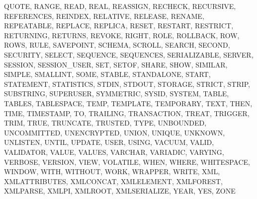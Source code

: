 \documentclass{article}
\begin{document}
QUOTE,
RANGE,
READ,
REAL,
REASSIGN,
RECHECK,
RECURSIVE,
REFERENCES,
REINDEX,
RELATIVE,
RELEASE,
RENAME,
REPEATABLE,
REPLACE,
REPLICA,
RESET,
RESTART,
RESTRICT,
RETURNING,
RETURNS,
REVOKE,
RIGHT,
ROLE,
ROLLBACK,
ROW,
ROWS,
RULE,
SAVEPOINT,
SCHEMA,
SCROLL,
SEARCH,
SECOND,
SECURITY,
SELECT,
SEQUENCE,
SEQUENCES,
SERIALIZABLE,
SERVER,
SESSION,
SESSION\_USER,
SET,
SETOF,
SHARE,
SHOW,
SIMILAR,
SIMPLE,
SMALLINT,
SOME,
STABLE,
STANDALONE,
START,
STATEMENT,
STATISTICS,
STDIN,
STDOUT,
STORAGE,
STRICT,
STRIP,
SUBSTRING,
SUPERUSER,
SYMMETRIC,
SYSID,
SYSTEM,
TABLE,
TABLES,
TABLESPACE,
TEMP,
TEMPLATE,
TEMPORARY,
TEXT,
THEN,
TIME,
TIMESTAMP,
TO,
TRAILING,
TRANSACTION,
TREAT,
TRIGGER,
TRIM,
TRUE,
TRUNCATE,
TRUSTED,
TYPE,
UNBOUNDED,
UNCOMMITTED,
UNENCRYPTED,
UNION,
UNIQUE,
UNKNOWN,
UNLISTEN,
UNTIL,
UPDATE,
USER,
USING,
VACUUM,
VALID,
VALIDATOR,
VALUE,
VALUES,
VARCHAR,
VARIADIC,
VARYING,
VERBOSE,
VERSION,
VIEW,
VOLATILE,
WHEN,
WHERE,
WHITESPACE,
WINDOW,
WITH,
WITHOUT,
WORK,
WRAPPER,
WRITE,
XML,
XMLATTRIBUTES,
XMLCONCAT,
XMLELEMENT,
XMLFOREST,
XMLPARSE,
XMLPI,
XMLROOT,
XMLSERIALIZE,
YEAR,
YES,
ZONE \\



\end{document}
